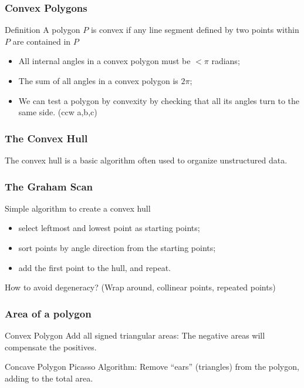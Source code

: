 \documentclass{beamer}
\begin{document}
\begin{frame}
  \frametitle{Convex Polygons}
  \begin{block}{Definition}
    A polygon $P$ is convex if any line segment defined by two points
    within $P$ are contained in $P$
  \end{block}
  \bigskip

  \begin{itemize}
  \item All internal angles in a convex polygon must be $< \pi$
    radians;
  \item The sum of all angles in a convex polygon is $2\pi$;
  \item We can test a polygon by convexity by checking that all its
    angles turn to the same side. (ccw a,b,c)
  \end{itemize}

\end{frame}

\begin{frame}
  \frametitle{The Convex Hull}
  \begin{block}{}
    The convex hull is a basic algorithm often used to organize
    unstructured data.
  \end{block}
  
  
\end{frame}

\begin{frame}
  \frametitle{The Graham Scan}
  \begin{block}{Simple algorithm to create a convex hull}
    \begin{itemize}
    \item select leftmost and lowest point as starting points;
    \item sort points by angle direction from the starting points;
    \item add the first point to the hull, and repeat.
    \end{itemize}
  \end{block}

  How to avoid degeneracy? (Wrap around, collinear points, repeated
  points)
\end{frame}

\begin{frame}
  \frametitle{Area of a polygon}
  \begin{block}{Convex Polygon}
    Add all signed triangular areas: The negative areas will
    compensate the positives.
  \end{block}
  \begin{block}{Concave Polygon}
    Picasso Algorithm: Remove ``ears'' (triangles) from the polygon,
    adding to the total area.
  \end{block}
\end{frame}
\end{document}
